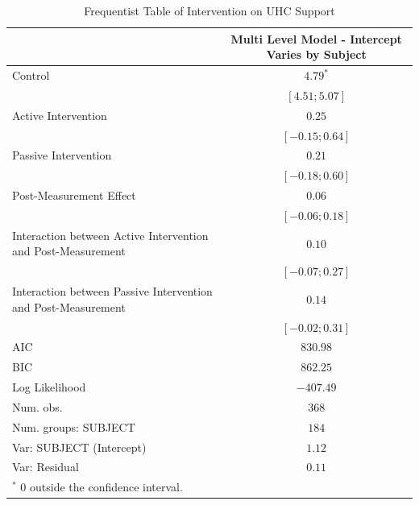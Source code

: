 \documentclass[
  english,
  man]{apa6}
\begin{document}
\begin{table}
\begin{center}
\begin{tabular}{l c}
\hline
 & Multi Level Model - Intercept Varies by Subject \\
\hline
Control                                                       & $4.79^{*}$       \\
                                                              & $ [ 4.51; 5.07]$ \\
Active Intervention                                           & $0.25$           \\
                                                              & $ [-0.15; 0.64]$ \\
Passive Intervention                                          & $0.21$           \\
                                                              & $ [-0.18; 0.60]$ \\
Post-Measurement Effect                                       & $0.06$           \\
                                                              & $ [-0.06; 0.18]$ \\
Interaction between Active Intervention and Post-Measurement  & $0.10$           \\
                                                              & $ [-0.07; 0.27]$ \\
Interaction between Passive Intervention and Post-Measurement & $0.14$           \\
                                                              & $ [-0.02; 0.31]$ \\
\hline
AIC                                                           & $830.98$         \\
BIC                                                           & $862.25$         \\
Log Likelihood                                                & $-407.49$        \\
Num. obs.                                                     & $368$            \\
Num. groups: SUBJECT                                          & $184$            \\
Var: SUBJECT (Intercept)                                      & $1.12$           \\
Var: Residual                                                 & $0.11$           \\
\hline
\multicolumn{2}{l}{\scriptsize{$^*$ 0 outside the confidence interval.}}
\end{tabular}
\caption{Frequentist Table of Intervention on UHC Support}
\label{tab:study_1_tabs}
\end{center}
\end{table}
\end{document}
